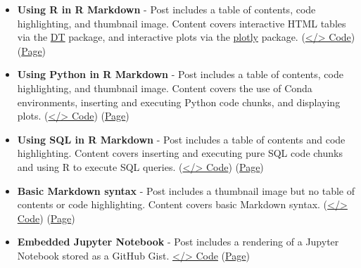 \documentclass[
]{book}
\begin{document}
\begin{itemize}
\item
  \textbf{Using R in R Markdown} - Post includes a table of contents, code highlighting, and thumbnail image. Content covers interactive HTML tables via the \href{https://rstudio.github.io/DT/}{DT} package, and interactive plots via the \href{https://plotly.com/r/}{plotly} package. (\href{https://github.com/dannymorris/r4sites-anatole-custom/blob/master/content/english/post/2021-04-22-sample-post-using-r-in-r-markdown/index.en.Rmd}{\textless/\textgreater{} Code}) (\href{https://r4sites-anatole-custom.netlify.app/post/2021-04-22-sample-post-using-r-in-r-markdown/}{Page})
\item
  \textbf{Using Python in R Markdown} - Post includes a table of contents, code highlighting, and thumbnail image. Content covers the use of Conda environments, inserting and executing Python code chunks, and displaying plots. (\href{https://github.com/dannymorris/r4sites-anatole-custom/blob/master/content/english/post/2021-04-30-sample-post-using-python-in-r-markdown/index.en.Rmd}{\textless/\textgreater{} Code}) (\href{https://r4sites-anatole-custom.netlify.app/post/2021-04-30-sample-post-using-python-in-r-markdown/}{Page})
\item
  \textbf{Using SQL in R Markdown} - Post includes a table of contents and code highlighting. Content covers inserting and executing pure SQL code chunks and using R to execute SQL queries. (\href{https://github.com/dannymorris/r4sites-anatole-custom/blob/master/content/english/post/2021-04-30-sample-post-using-sql-in-r-markdown/index.en.Rmd}{\textless/\textgreater{} Code}) (\href{https://r4sites-anatole-custom.netlify.app/post/2021-04-30-sample-post-using-sql-in-r-markdown/}{Page})
\item
  \textbf{Basic Markdown syntax} - Post includes a thumbnail image but no table of contents or code highlighting. Content covers basic Markdown syntax. (\href{https://github.com/dannymorris/r4sites-anatole-custom/blob/master/content/english/post/2021-04-30-sample-post-basic-markdown-syntax/index.en.Rmd}{\textless/\textgreater{} Code}) (\href{https://r4sites-anatole-custom.netlify.app/post/2021-04-30-sample-post-basic-markdown-syntax/}{Page})
\item
  \textbf{Embedded Jupyter Notebook} - Post includes a rendering of a Jupyter Notebook stored as a GitHub Gist. \href{https://gist.github.com/dannymorris/65bfd1e920b5c3673d7358cdf9d9753f}{\textless/\textgreater{} Code} (\href{https://abndistro.com/post/2021/05/20/using-pyspark-and-mllib-to-generate-association-rules-from-continuous-features/}{Page})
\end{itemize}
\end{document}
